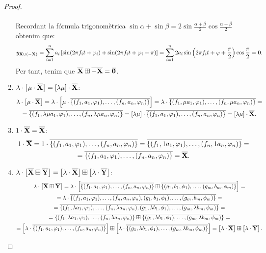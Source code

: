 \documentclass{article}
\theoremstyle{math}
\newcommand{\0}{\ensuremath{\vb{0}}}
\newcommand{\X}{\ensuremath{\vb{X}}}
\newcommand{\Y}{\ensuremath{\vb{Y}}}
\begin{document}
\begin{proof}
\begin{enumerate}
\begin{multline*}
        \end{multline*}
        Recordant la fórmula trigonomètrica $\sin\alpha+\sin\beta=2\sin\frac{\alpha+\beta}{2}\cos\frac{\alpha-\beta}{2}$ obtenim que: $$y_{\X\cup(-\X)}=\sum_{i=1}^na_i\left[\sin(2\pi f_it+\varphi_i)+\sin(2\pi f_it+\varphi_i+\pi)\right]=\sum_{i=1}^n2a_i\sin\left(2\pi f_it+\varphi +\frac{\pi}{2}\right)\cos\frac{\pi}{2}=0.$$ Per tant, tenim que $\overline{\X}\boxplus\overline{-\X}=\overline{\0}$.
        \item $\lambda\cdot\left[\mu\cdot \overline{\X}\right]=[\lambda\mu]\cdot \overline{\X}$:
        \begin{multline*}
            \lambda\cdot\left[\mu\cdot \overline{\X}\right]=\lambda\cdot\left[\mu\cdot\overline{\{(f_1,a_1,\varphi_1),\ldots,(f_n,a_n,\varphi_n)\}}\right]=\lambda\cdot\overline{\{(f_1,\mu a_1,\varphi_1),\ldots,(f_n,\mu a_n,\varphi_n)\}}=\\=\overline{\{(f_1,\lambda\mu a_1,\varphi_1),\ldots,(f_n,\lambda\mu a_n,\varphi_n)\}}=[\lambda\mu]\cdot\overline{\{(f_1,a_1,\varphi_1),\ldots,(f_n,a_n,\varphi_n)\}}=[\lambda\mu]\cdot \overline{\X}.
        \end{multline*}
        \item $1\cdot \overline{\X}=\overline{\X}$:
        \begin{multline*}
            1\cdot\overline{\X}=1\cdot\overline{\{(f_1,a_1,\varphi_1),\ldots,(f_n,a_n,\varphi_n)\}}=\overline{\{(f_1,1a_1,\varphi_1),\ldots,(f_n,1a_n,\varphi_n)\}}=\\=\overline{\{(f_1,a_1,\varphi_1),\ldots,(f_n,a_n,\varphi_n)\}}=\overline{\X}.
        \end{multline*}
        \item $\lambda\cdot\left[\overline{\X}\boxplus\overline{\Y}\right]=\left[\lambda\cdot \overline{\X}\right]\boxplus\left[\lambda\cdot \overline{\Y}\right]$:
        \begin{multline*}
            \lambda\cdot\left[\overline{\X}\boxplus \overline{\Y}\right]=\lambda\cdot\left[\overline{\{(f_1,a_1,\varphi_1),\ldots,(f_n,a_n,\varphi_n)\}}\boxplus\overline{\{(g_1,b_1,\phi_1),\ldots,(g_m,b_m,\phi_m)\}}\right]=\\=\lambda\cdot\overline{\{(f_1, a_1,\varphi_1),\ldots,(f_n, a_n,\varphi_n),(g_1,b_1,\phi_1),\ldots,(g_m,b_m,\phi_m)\}}=\\=\overline{\{(f_1,\lambda a_1,\varphi_1),\ldots,(f_n,\lambda a_n,\varphi_n),(g_1,\lambda b_1,\phi_1),\ldots,(g_m,\lambda b_m,\phi_m)\}}=\\=\overline{\{(f_1,\lambda a_1,\varphi_1),\ldots,(f_n,\lambda a_n,\varphi_n)\}}\boxplus\overline{\{(g_1,\lambda b_1,\phi_1),\ldots,(g_m,\lambda b_m,\phi_m)\}}=\\=\left[\lambda\cdot\overline{\{(f_1,a_1,\varphi_1),\ldots,(f_n,a_n,\varphi_n)\}}\right]\boxplus\left[\lambda\cdot\overline{\{(g_1,\lambda b_1,\phi_1),\ldots,(g_m,\lambda b_m,\phi_m)\}}\right]=\left[\lambda\cdot \overline{\X}\right]\boxplus\left[\lambda\cdot \overline{\Y}\right].

\end{multline*}
\end{enumerate}
\end{proof}
\end{document}
